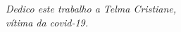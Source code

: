 \begin{dedicatoria}
   \vspace*{\fill}
   \centering
   \noindent
   \textit{Dedico este trabalho a Telma Cristiane,\\ vítima da covid-19.} \vspace*{\fill}
\end{dedicatoria}